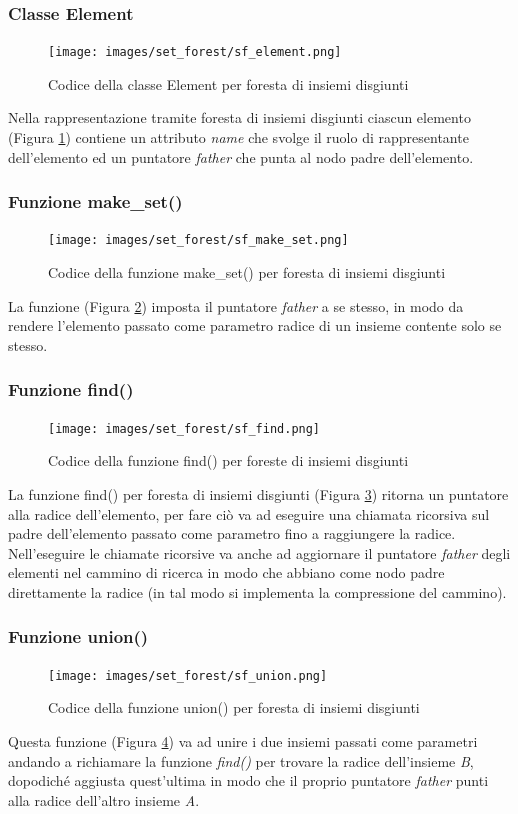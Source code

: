 \documentclass[12pt]{article}
\begin{document}
\subsubsection{Classe Element}
\begin{figure}[h]
    \centering
    \texttt{[image: images/set\_forest/sf\_element.png]}
    \caption{Codice della classe Element per foresta di insiemi disgiunti}
    \label{fig:sf_element}
\end{figure}
Nella rappresentazione tramite foresta di insiemi disgiunti ciascun elemento (Figura \ref{fig:sf_element}) contiene un attributo \textit{name} che svolge il ruolo di rappresentante dell'elemento ed un puntatore \textit{father} che punta al nodo padre dell'elemento.

\subsubsection{Funzione make\_set()}
\begin{figure}[h]
    \centering
    \texttt{[image: images/set\_forest/sf\_make\_set.png]}
    \caption{Codice della funzione make\_set() per foresta di insiemi disgiunti}
    \label{fig:sf_make_set}
\end{figure}
La funzione (Figura \ref{fig:sf_make_set}) imposta il puntatore \textit{father} a se stesso, in modo da rendere l'elemento passato come parametro radice di un insieme contente solo se stesso.

\subsubsection{Funzione find()}
\begin{figure}[h]
    \centering
    \texttt{[image: images/set\_forest/sf\_find.png]}
    \caption{Codice della funzione find() per foreste di insiemi disgiunti}
    \label{fig:sf_find}
\end{figure}
La funzione find() per foresta di insiemi disgiunti (Figura \ref{fig:sf_find}) ritorna un puntatore alla radice dell'elemento, per fare ciò va ad eseguire una chiamata ricorsiva sul padre dell'elemento passato come parametro fino a raggiungere la radice.\\
Nell'eseguire le chiamate ricorsive va anche ad aggiornare il puntatore \textit{father} degli elementi nel cammino di ricerca in modo che abbiano come nodo padre direttamente la radice (in tal modo si implementa la compressione del cammino).

\subsubsection{Funzione union()}
\begin{figure}[h]
    \centering
    \texttt{[image: images/set\_forest/sf\_union.png]}
    \caption{Codice della funzione union() per foresta di insiemi disgiunti}
    \label{fig:sf_union}
\end{figure}
Questa funzione (Figura \ref{fig:sf_union}) va ad unire i due insiemi passati come parametri andando a richiamare la funzione \textit{find()} per trovare la radice dell'insieme \textit{B}, dopodiché aggiusta quest'ultima in modo che il proprio puntatore \textit{father} punti alla radice dell'altro insieme \textit{A}.
\end{document}

